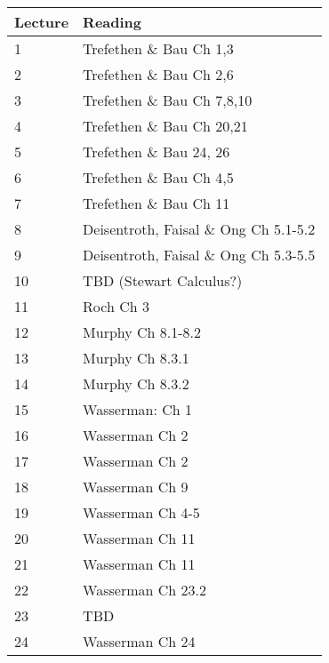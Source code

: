 \documentclass[11pt]{article}
\begin{document}
~\\
\small
\begin{centering}
\begin{tabular}{||l|p{3in}||}
\hline\hline
Lecture & Reading    \\
\hline\hline
1      &   Trefethen \& Bau Ch 1,3  \\
\hline
2     &  Trefethen \& Bau Ch 2,6  \\
\hline
3      &  Trefethen \& Bau Ch 7,8,10  \\
\hline
4 &  Trefethen \& Bau Ch 20,21 \\
\hline
5 &  Trefethen \& Bau 24, 26 \\
\hline
6 &  Trefethen \& Bau  Ch 4,5    \\
\hline 
7 & Trefethen \& Bau  Ch 11   \\
\hline 
8 & Deisentroth, Faisal \& Ong Ch 5.1-5.2   \\
\hline 
9 &   Deisentroth, Faisal \& Ong Ch 5.3-5.5  \\
\hline 
10 &  TBD (Stewart Calculus?)  \\
\hline 
11 &  Roch Ch 3   \\
\hline 
12 &  Murphy Ch 8.1-8.2  \\
\hline 
13 &   Murphy Ch 8.3.1 \\
\hline 
14 &   Murphy Ch 8.3.2  \\
\hline 
15 & Wasserman: Ch 1   \\
\hline 
16 &  Wasserman Ch 2  \\
\hline 
17 & Wasserman Ch 2   \\
\hline 
18 &  Wasserman Ch 9\\
\hline 
19 & Wasserman Ch 4-5 \\
\hline 
20 &    Wasserman Ch 11  \\
\hline 
21 &   Wasserman Ch 11   \\
\hline 
22 &    Wasserman Ch 23.2 \\
\hline 
23 &  TBD  \\
\hline 
24 &   Wasserman Ch 24 \\
\hline
\hline

\end{tabular}\\
\end{centering}
\end{document}
